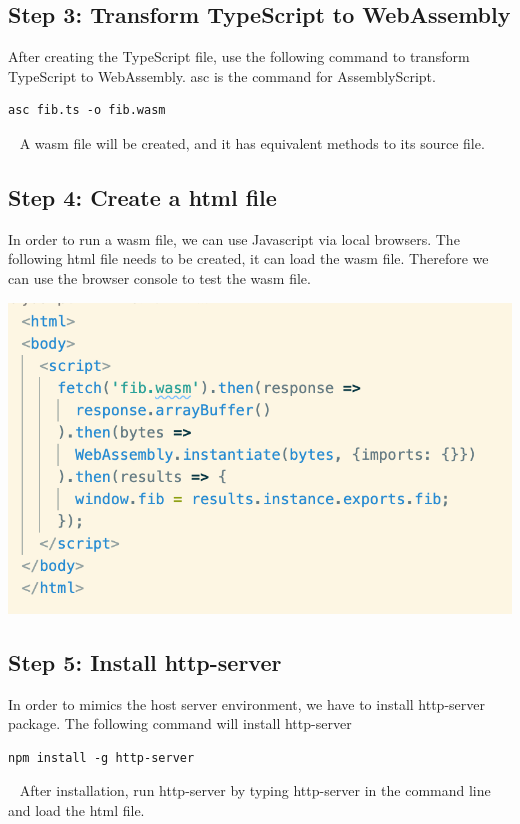 \documentclass[12pt]{article}
\begin{document}
\subsection{Step 3: Transform TypeScript to WebAssembly}
After creating the TypeScript file, use the following command to transform TypeScript to WebAssembly. asc is the command for 
AssemblyScript.
~\newline
\begin{verbatim}
asc fib.ts -o fib.wasm
\end{verbatim}
~\newline
A wasm file will be created, and it has equivalent methods to its source file.

\subsection{Step 4: Create a html file}
In order to run a wasm file, we can use Javascript via local browsers. The following html file needs to be created, it can 
load the wasm file. Therefore we can use the browser console to test the wasm file.
~\newline

\includegraphics[scale = 0.6]{img/as-html}

\subsection{Step 5: Install http-server}
In order to mimics the host server environment, we have to install http-server package. The following command will install http-server
~\newline
\begin{verbatim}
npm install -g http-server
\end{verbatim}
~\newline
After installation, run http-server by typing http-server in the command line and load the html file.
\end{document}
